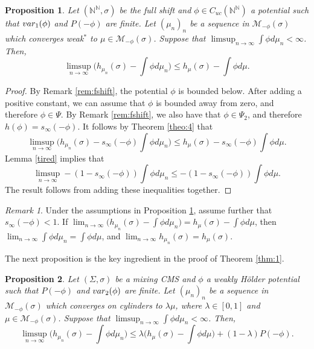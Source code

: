 \documentclass[letterpaper,11pt]{amsart}
\theoremstyle{plain}
\theoremstyle{plain}
\newtheorem{proposition}{Proposition}[subsection]
\theoremstyle{definition}
\theoremstyle{remark}
\newtheorem{remark}{Remark}[section]
\def\N{{\mathbb N}}
\def\M{{\mathcal M}}
\begin{document}
\begin{proposition}\label{cor:v} Let $(\N^\N,\sigma)$ be the full shift and $\phi\in C_{uc}(\N^\N)$ a potential such that $\emph{var}_1(\phi)$ and $P(-\phi)$ are finite. Let $(\mu_n)_n$ be a sequence in $\M_{-\phi}(\sigma)$ which converges weak$^*$ to $\mu\in \M_{-\phi}(\sigma)$. Suppose that $\limsup_{n\to\infty} \int \phi d\mu_n<\infty$. Then, $$\limsup_{n\to\infty}\big( h_{\mu_n}(\sigma)-\int \phi d\mu_n\big)\le h_\mu(\sigma)-\int \phi d\mu.$$
\end{proposition}
\begin{proof} By Remark \ref{rem:fshift}, the potential $\phi$ is bounded below. After adding a positive constant, we can assume that $\phi$ is bounded away from zero, and therefore $\phi\in \Psi$. By Remark \ref{rem:fshift}, we also have that $\phi\in \Psi_2$, and therefore $h(\phi)=s_\infty(-\phi)$. It follows by Theorem \ref{theo:4} that
$$\limsup_{n\to\infty}\big( h_{\mu_n}(\sigma)-s_\infty(-\phi)\int \phi d\mu_n\big)\le h_\mu(\sigma)-s_\infty(-\phi)\int \phi d\mu.$$
Lemma \ref{tired} implies that 
$$\limsup_{n\to\infty}-(1-s_\infty(-\phi))\int \phi d\mu_n\le -(1-s_\infty(-\phi))\int \phi d\mu.$$
The result follows from adding these inequalities together.
\end{proof}
 
\begin{remark} Under the assumptions in Proposition \ref{cor:v}, assume further that $s_\infty(-\phi)<1$. If  $\lim_{n\to\infty}\big(h_{\mu_n}(\sigma)-\int \phi d\mu_n\big)=h_\mu(\sigma)-\int \phi d\mu$,  then $\lim_{n\to\infty}\int \phi d\mu_n=\int \phi d\mu$, and $\lim_{n\to\infty}h_{\mu_n}(\sigma)=h_\mu(\sigma)$.
\end{remark}

The next proposition is the key ingredient in the proof of Theorem \ref{thm:1}.

\begin{proposition}\label{prop:5}  Let $(\Sigma,\sigma)$ be a mixing CMS and $\phi$ a weakly H\"older potential such that $P(-\phi)$ and $\emph{var}_2(\phi)$ are finite.  Let $(\mu_n)_n$ be a sequence  in $\M_{-\phi}(\sigma)$ which converges on cylinders to $\lambda\mu$, where $\lambda\in [0,1]$ and $\mu\in \M_{-\phi}(\sigma)$. Suppose that $\limsup_{n\to\infty}\int \phi  d\mu_n<\infty$. Then,
$$\limsup_{n\to\infty}\big(h_{\mu_n}(\sigma)-\int \phi d\mu_n\big)\le \lambda\big(h_\mu(\sigma)-\int \phi d\mu\big)+(1-\lambda)P(-\phi).$$
\end{proposition}
\end{document}
